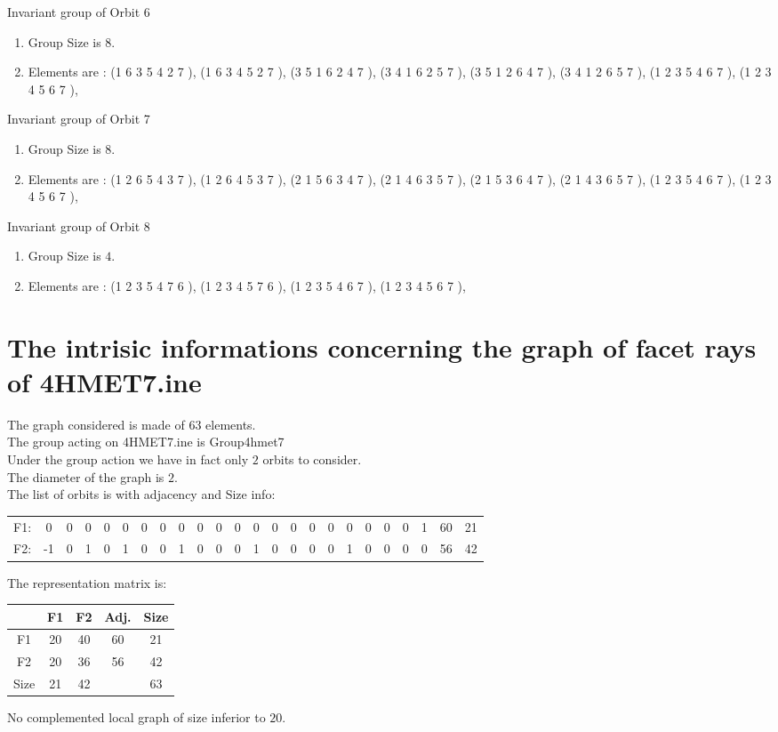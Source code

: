 \documentclass[12pt]{article}
\begin{document}
Invariant group of Orbit 6
\begin{enumerate}
\item Group Size is $8$.
\item Elements are : (1 6 3 5 4 2 7  ), (1 6 3 4 5 2 7  ), (3 5 1 6 2 4 7  ), (3 4 1 6 2 5 7  ), (3 5 1 2 6 4 7  ), (3 4 1 2 6 5 7  ), (1 2 3 5 4 6 7  ), (1 2 3 4 5 6 7  ), 
\end{enumerate}
Invariant group of Orbit 7
\begin{enumerate}
\item Group Size is $8$.
\item Elements are : (1 2 6 5 4 3 7  ), (1 2 6 4 5 3 7  ), (2 1 5 6 3 4 7  ), (2 1 4 6 3 5 7  ), (2 1 5 3 6 4 7  ), (2 1 4 3 6 5 7  ), (1 2 3 5 4 6 7  ), (1 2 3 4 5 6 7  ), 
\end{enumerate}
Invariant group of Orbit 8
\begin{enumerate}
\item Group Size is $4$.
\item Elements are : (1 2 3 5 4 7 6  ), (1 2 3 4 5 7 6  ), (1 2 3 5 4 6 7  ), (1 2 3 4 5 6 7  ), 
\end{enumerate}
\section{The intrisic informations concerning the graph of facet rays of 4HMET7.ine}
The graph considered is made of $63$ elements.\\
The group acting on 4HMET7.ine is Group4hmet7\\
Under the group action we have in fact only $2$ orbits to consider.\\
The diameter of the graph is $2$.\\
The list of orbits is with adjacency and Size info:
\begin{center}
\scriptsize
\begin{tabular}{cccccccccccccccccccccc|c|c}
F1:&0&0&0&0&0&0&0&0&0&0&0&0&0&0&0&0&0&0&0&0&1&60&21\\
F2:&-1&0&1&0&1&0&0&1&0&0&0&1&0&0&0&0&1&0&0&0&0&56&42\\
\end{tabular}
\end{center}
The representation matrix is:
\begin{center}
\scriptsize
\begin{tabular}{|c|cc|c|c|}
\hline
&F1&F2&Adj.&Size\\
\hline
F1& 20& 40&60&21\\
F2& 20& 36&56&42\\
\hline
Size&21&42&&63\\
\hline
\end{tabular}
\end{center}
No complemented local graph of size inferior to $20$.
\end{document}
